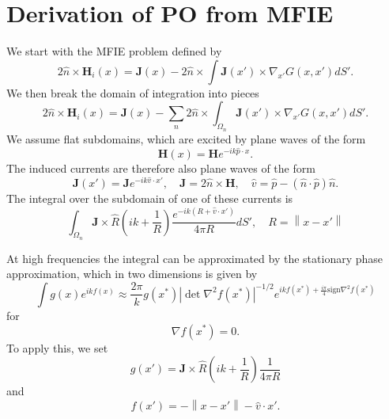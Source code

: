 \documentclass{article}
\newcommand{\norm}[1]{\left\lVert #1 \right\rVert}
\newcommand{\abs}[1]{\left\lvert #1 \right\rvert}
\theoremstyle{plain}
\begin{document}
\section{Derivation of PO from MFIE}

We start with the MFIE problem defined by
\begin{equation}
	2\hat{n}\times\mathbf{H}_i(x)
	= \mathbf{J}(x)
	- 2\hat{n}\times\int \mathbf{J}(x') \times \nabla_{x'} G(x,x') dS'.
\end{equation}
We then break the domain of integration into pieces
\begin{equation}
	2\hat{n}\times\mathbf{H}_i(x)
	= \mathbf{J}(x)
	- \sum_n 2\hat{n}\times\int_{\Omega_n} \mathbf{J}(x') \times \nabla_{x'} G(x,x') dS'.
\end{equation}
We assume flat subdomains, which are excited by plane waves of the form
\begin{equation}
	\mathbf{H}(x) = \mathbf{H}e^{-ik \hat{p} \cdot x}.
\end{equation}
The induced currents are therefore also plane waves of the form
\begin{equation}
	\mathbf{J}(x') = \mathbf{J}e^{-ik \hat{v} \cdot x'},
	\quad \mathbf{J} = 2\hat{n}\times\mathbf{H},
	\quad \hat{v} = \hat{p} - \left( \hat{n}\cdot\hat{p} \right)\hat{n}.
\end{equation}
The integral over the subdomain of one of these currents is
\begin{equation}
	\int_{\Omega_n}
	\mathbf{J} \times \hat{R}
	\left( ik + \frac{1}{R} \right)
	\frac{e^{-ik\left(R + \hat{v} \cdot x'\right)}}{4\pi R} dS',
	\quad R = \norm{x-x'}
\end{equation}



At high frequencies the integral can be approximated by the stationary phase approximation,
which in two dimensions is given by
\begin{equation}
	\int g(x) e^{ikf(x)}
	\approx \frac{2\pi}{k} g(x^*)
	\abs{\det \nabla^2 f(x^*)}^{-1/2}
	e^{ikf(x^*) + \frac{i\pi}{4}\text{sign}\nabla^2 f(x^*)}
\end{equation}
for
\begin{equation}
	\nabla f(x^*) = 0.
\end{equation}
To apply this, we set
\begin{equation}
	g(x') = 
	\mathbf{J} \times \hat{R}
	\left( ik + \frac{1}{R} \right)
	\frac{1}{4\pi R}
\end{equation}
and
\begin{equation}
	f(x') = -\norm{x-x'} - \hat{v}\cdot x'.
\end{equation}
\end{document}
